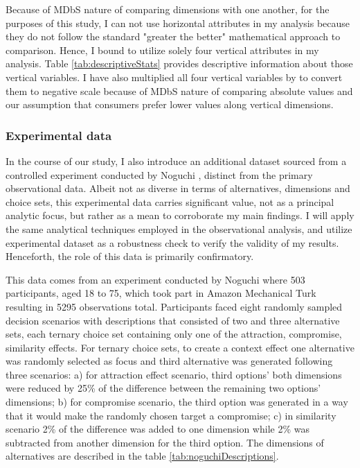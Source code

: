 \documentclass[a4paper,12pt]{article}
\newcommand{\citeyearonly}[1]{\citeyearpar{#1}}
\begin{document}
Because of MDbS nature of comparing dimensions with one another, for the purposes of this study, I can not use horizontal attributes in my analysis because they do not follow the standard "greater the better" mathematical approach to comparison. Hence, I bound to utilize solely four vertical attributes in my analysis. Table \ref{tab:descriptiveStats} provides descriptive information about those vertical variables. I have also multiplied all four vertical variables by  to convert them to negative scale because of MDbS nature of comparing absolute values and our assumption that consumers prefer lower values along vertical dimensions.

\subsubsection{Experimental data}

In the course of our study, I also introduce an additional dataset sourced from a controlled experiment conducted by Noguchi \citeyearonly{noguchi2018multialternative}, distinct from the primary observational data. Albeit not as diverse in terms of alternatives, dimensions and choice sets, this experimental data carries significant value, not as a principal analytic focus, but rather as a mean to corroborate my main findings. I will apply the same analytical techniques employed in the observational analysis, and utilize experimental dataset as a robustness check to verify the validity of my results. Henceforth, the role of this data is primarily confirmatory.

This data comes from an experiment conducted by Noguchi \citeyearonly{noguchi2018multialternative} where 503 participants, aged 18 to 75, which took part in Amazon Mechanical Turk resulting in 5295 observations total. Participants faced eight randomly sampled decision scenarios with descriptions that consisted of two and three alternative sets, each ternary choice set containing only one of the attraction, compromise, similarity effects. For ternary choice sets, to create a context effect one alternative was randomly selected as focus and third alternative was generated following three scenarios: a) for attraction effect scenario, third options' both dimensions were reduced by 25\% of the difference between the remaining two options' dimensions; b) for compromise scenario, the third option was generated in a way that it would make the randomly chosen target a compromise; c) in similarity scenario 2\% of the difference was added to one dimension while 2\% was subtracted from another dimension for the third option. The dimensions of alternatives are described in the table \ref{tab:noguchiDescriptions}.
\end{document}
